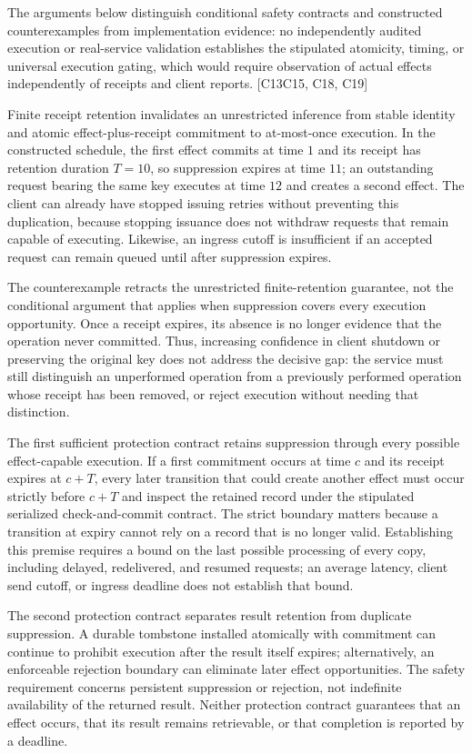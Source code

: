 \documentclass[11pt]{article}
\begin{document}
The arguments below distinguish conditional safety contracts and constructed counterexamples from implementation evidence: no independently audited execution or real-service validation establishes the stipulated atomicity, timing, or universal execution gating, which would require observation of actual effects independently of receipts and client reports. [C13\textendash{}\allowbreak{}C15, C18, C19]

Finite receipt retention invalidates an unrestricted inference from stable identity and atomic effect-plus-receipt commitment to at-most-once execution. In the constructed schedule, the first effect commits at time $1$ and its receipt has retention duration $T=10$, so suppression expires at time $11$; an outstanding request bearing the same key executes at time $12$ and creates a second effect. The client can already have stopped issuing retries without preventing this duplication, because stopping issuance does not withdraw requests that remain capable of executing. Likewise, an ingress cutoff is insufficient if an accepted request can remain queued until after suppression expires.

The counterexample retracts the unrestricted finite-retention guarantee, not the conditional argument that applies when suppression covers every execution opportunity. Once a receipt expires, its absence is no longer evidence that the operation never committed. Thus, increasing confidence in client shutdown or preserving the original key does not address the decisive gap: the service must still distinguish an unperformed operation from a previously performed operation whose receipt has been removed, or reject execution without needing that distinction.

The first sufficient protection contract retains suppression through every possible effect-capable execution. If a first commitment occurs at time $c$ and its receipt expires at $c+T$, every later transition that could create another effect must occur strictly before $c+T$ and inspect the retained record under the stipulated serialized check-and-commit contract. The strict boundary matters because a transition at expiry cannot rely on a record that is no longer valid. Establishing this premise requires a bound on the last possible processing of every copy, including delayed, redelivered, and resumed requests; an average latency, client send cutoff, or ingress deadline does not establish that bound.

The second protection contract separates result retention from duplicate suppression. A durable tombstone installed atomically with commitment can continue to prohibit execution after the result itself expires; alternatively, an enforceable rejection boundary can eliminate later effect opportunities. The safety requirement concerns persistent suppression or rejection, not indefinite availability of the returned result. Neither protection contract guarantees that an effect occurs, that its result remains retrievable, or that completion is reported by a deadline.
\end{document}
